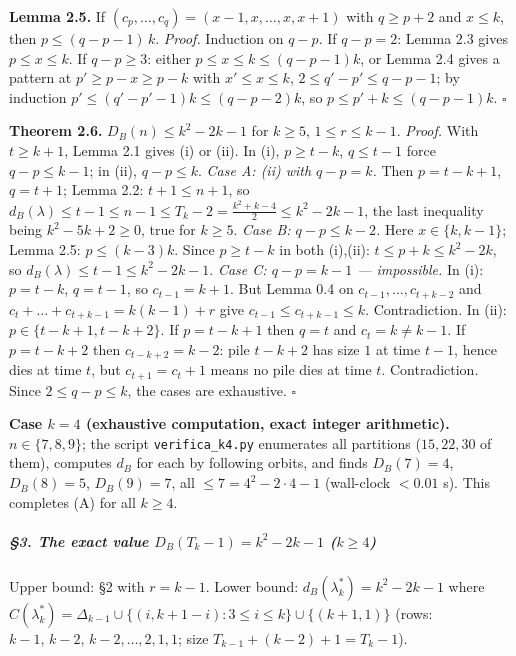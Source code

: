 \textbf{Lemma 2.5.} If \((c_p,\dots,c_q)=(x-1,x,\dots,x,x+1)\) with
\(q\ge p+2\) and \(x\le k\), then \(p\le (q-p-1)\,k\). \emph{Proof.}
Induction on \(q-p\). If \(q-p=2\): Lemma 2.3 gives \(p\le x\le k\). If
\(q-p\ge3\): either \(p\le x\le k\le(q-p-1)k\), or Lemma 2.4 gives a
pattern at \(p'\ge p-x\ge p-k\) with \(x'\le x\le k\),
\(2\le q'-p'\le q-p-1\); by induction \(p'\le(q'-p'-1)k\le(q-p-2)k\), so
\(p\le p'+k\le(q-p-1)k\). \(\square\)

\textbf{Theorem 2.6.} \(D_B(n)\le k^2-2k-1\) for \(k\ge5\),
\(1\le r\le k-1\). \emph{Proof.} With \(t\ge k+1\), Lemma 2.1 gives (i)
or (ii). In (i), \(p\ge t-k\), \(q\le t-1\) force \(q-p\le k-1\); in
(ii), \(q-p\le k\). \emph{Case A: (ii) with \(q-p=k\).} Then
\(p=t-k+1\), \(q=t+1\); Lemma 2.2: \(t+1\le n+1\), so
\(d_B(\lambda)\le t-1\le n-1\le T_k-2=\tfrac{k^2+k-4}{2}\le k^2-2k-1\),
the last inequality being \(k^2-5k+2\ge0\), true for \(k\ge5\).
\emph{Case B: \(q-p\le k-2\).} Here \(x\in\{k,k-1\}\); Lemma 2.5:
\(p\le(k-3)k\). Since \(p\ge t-k\) in both (i),(ii):
\(t\le p+k\le k^2-2k\), so \(d_B(\lambda)\le t-1\le k^2-2k-1\).
\emph{Case C: \(q-p=k-1\) --- impossible.} In (i): \(p=t-k\), \(q=t-1\),
so \(c_{t-1}=k+1\). But Lemma 0.4 on \(c_{t-1},\dots,c_{t+k-2}\) and
\(c_t+\dots+c_{t+k-1}=k(k-1)+r\) give \(c_{t-1}\le c_{t+k-1}\le k\).
Contradiction. In (ii): \(p\in\{t-k+1,t-k+2\}\). If \(p=t-k+1\) then
\(q=t\) and \(c_t=k\ne k-1\). If \(p=t-k+2\) then \(c_{t-k+2}=k-2\):
pile \(t-k+2\) has size \(1\) at time \(t-1\), hence dies at time \(t\),
but \(c_{t+1}=c_t+1\) means no pile dies at time \(t\). Contradiction.
Since \(2\le q-p\le k\), the cases are exhaustive. \(\square\)

\textbf{Case \(k=4\) (exhaustive computation, exact integer
arithmetic).} \(n\in\{7,8,9\}\); the script \texttt{verifica\_k4.py}
enumerates all partitions (\(15,22,30\) of them), computes \(d_B\) for
each by following orbits, and finds \(D_B(7)=4\), \(D_B(8)=5\),
\(D_B(9)=7\), all \(\le 7=4^2-2\cdot4-1\) (wall-clock \(<0.01\) s). This
completes (A) for all \(k\ge4\).

\subparagraph{\texorpdfstring{§3. The exact value
\(D_B(T_k-1)=k^2-2k-1\)
(\(k\ge4\))}{§3. The exact value D\_B(T\_k-1)=k\^{}2-2k-1 (k\textbackslash ge4)}}\label{the-exact-value-d_bt_k-1k2-2k-1-kge4}

Upper bound: §2 with \(r=k-1\). Lower bound:
\(d_B(\lambda^*_k)=k^2-2k-1\) where
\(C(\lambda^*_k)=\Delta_{k-1}\cup\{(i,k+1-i):3\le i\le k\}\cup\{(k+1,1)\}\)
(rows: \(k-1,\,k-2,\,k-2,\dots,2,1,1\); size \(T_{k-1}+(k-2)+1=T_k-1\)).

